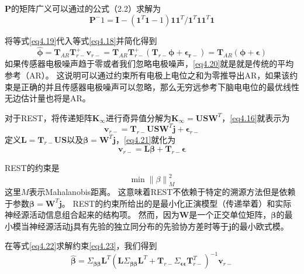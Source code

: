 $\mathbf{P}$的矩阵广义可以通过\cite{baksalary_revisitation_2003}的公式（2.2）求解为
\begin{equation}\label{eq4.19}
\mathbf{P}^-1=\mathbf{I}-(\mathbf{1}^T\mathbf{1}-1)\mathbf{11}^T/{\mathbf{1}^T\mathbf{11}^T\mathbf{1}}
\end{equation}

将等式\eqref{eq4.19}代入等式\eqref{eq4.18}并简化得到
\begin{equation}\label{eq4.20}
\hat{\mathbf{\phi}}=\mathbf{T}_{AR}\mathbf{T}_{r-}^+\mathbf{v}_{r-}=\mathbf{T}_{AR}\mathbf{T}_{r-}^+(\mathbf{T}_{r-}\mathbf{\phi}+\mathbf{\epsilon_{r-}})=\mathbf{T}_{AR}(\mathbf{\phi}+\mathbf{\epsilon})
\end{equation}
如果传感器电极噪声趋于零或者我们忽略电极噪声，\eqref{eq4.20}就是就是传统的平均参考（AR）。 这说明可以通过约束所有电极上电位之和为零推导出AR，如果该约束是正确的并且传感器电极噪声可以忽略，那么无穷远参考下脑电电位的最优线性无边估计量也将是AR。

对于REST，将传递矩阵$\mathbf{K}_{\infty}$进行奇异值分解为$\mathbf{K}_{\infty}=\mathbf{USW}^T$，\eqref{eq4.16}就表示为
\begin{equation}\label{eq4.21}
\mathbf{v}_{r-}=\mathbf{T}_{r-}\mathbf{USW}^T\mathbf{j}+\mathbf{\epsilon}_{r-}
\end{equation}
定义$\mathbf{L}=\mathbf{T}_{r-}\mathbf{US}$以及$\mathbf{\beta}=\mathbf{W}^T\mathbf{j}$，\eqref{eq4.21}就化为
\begin{equation}\label{eq4.22}
\mathbf{v}_{r-}=\mathbf{L\beta}+\mathbf{T}_{r-}\mathbf{\epsilon}
\end{equation}

REST的约束是
\begin{equation}\label{eq4.23}
\min{\lVert{\beta}\rVert}_M^2
\end{equation}
这里$M$表示Mahalanobis距离。 这意味着REST不依赖于特定的溯源方法但是依赖于参数$\mathbf{\beta}=\mathbf{W}^T\mathbf{j}$。 REST的约束所给出的是最小化正演模型（传递举着）和实际神经源活动信息组合起来的结构项。 然而，因为$\mathbf{W}$是一个正交单位矩阵，$\mathbf{\beta}$的最小模当神经源活动$\mathbf{j}$具有先验的独立同分布的先验协方差时等于$\mathbf{j}$的最小欧式模。

在等式\eqref{eq4.22}求解约束\eqref{eq4.23}，我们得到
\begin{equation}\label{eq4.24}
\hat{\mathbf{\beta}}=\Sigma_{\mathbf{\beta\beta}}\mathbf{L}^T(\mathbf{L}\Sigma_\mathbf{\beta\beta}\mathbf{L}^T+\mathbf{T}_{r-}\Sigma_{\mathbf{\epsilon\epsilon}}\mathbf{T}_{r-}^T)^{-1}\mathbf{v}_{r-}
\end{equation}

